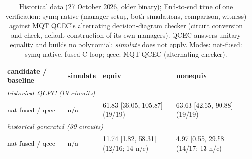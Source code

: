 \begin{table}[t]
\centering\scriptsize
\setlength{\tabcolsep}{4pt}
\caption{Historical data (27 October 2026, older binary); End-to-end time of one verification: symq native (manager setup, both simulations, comparison, witness) against MQT QCEC's alternating decision-diagram checker (circuit conversion and check, default construction of its own managers). QCEC answers unitary equality and builds no polynomial; \emph{simulate} does not apply. Modes: \textsf{nat-fused}: symq native, fused C loop; \textsf{qcec}: MQT QCEC (alternating checker).}
\label{tab:qcec}
\begin{tabular}{llll}
\toprule
candidate / baseline & simulate & equiv & nonequiv \\
\midrule
\multicolumn{4}{l}{\emph{historical QCEC (19 circuits)}} \\
\textsf{nat-fused} / \textsf{qcec} & n/a & 61.83 [36.05, 105.87]\,{\scriptsize(19/19)} & 63.63 [42.65, 90.88]\,{\scriptsize(19/19)} \\
\midrule
\multicolumn{4}{l}{\emph{historical generated (30 circuits)}} \\
\textsf{nat-fused} / \textsf{qcec} & n/a & 11.74 [1.82, 58.31]\,{\scriptsize(12/16; 14 n/c)} & 4.97 [0.55, 29.58]\,{\scriptsize(14/17; 13 n/c)} \\
\bottomrule
\end{tabular}
\end{table}

